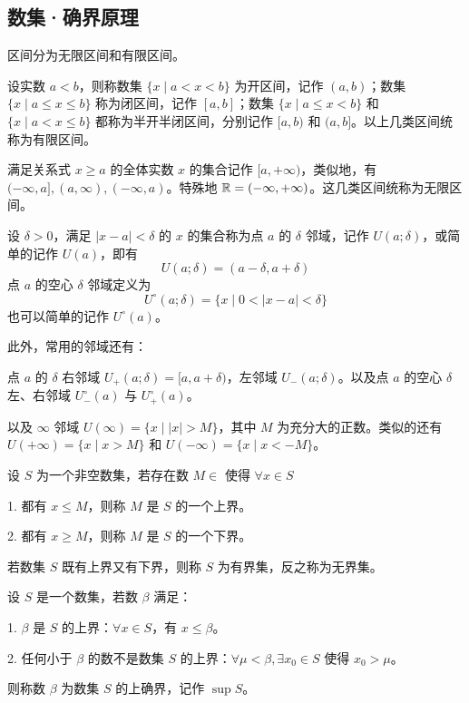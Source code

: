 \subsection{数集·确界原理}

区间分为无限区间和有限区间。

设实数 $a<b$，则称数集 $\{x \mid a<x<b\}$ 为开区间，记作 $(a,b)$；数集 $\{x \mid a\leqslant x \leqslant b\}$ 称为闭区间，记作 $[a,b]$；数集 $\{x \mid a\leqslant x<b\}$ 和 $\{x \mid a<x\leqslant b\}$ 都称为半开半闭区间，分别记作 $[a,b)$ 和 $(a,b]$。以上几类区间统称为有限区间。

满足关系式 $x\ge a$ 的全体实数 $x$ 的集合记作 $[a,+\infty)$，类似地，有 $(-\infty,a],(a,\infty),(-\infty,a)$。特殊地 $\mathbb{R} = (-\infty,+\infty)$。这几类区间统称为无限区间。

设 $\delta > 0$，满足 $|x-a|<\delta$ 的 $x$ 的集合称为点 $a$ 的 $\delta$ 邻域，记作 $U(a;\delta)$，或简单的记作 $U(a)$，即有
$$U(a;\delta) = (a-\delta,a+\delta)$$
点 $a$ 的空心 $\delta$ 邻域定义为
$$U^\circ (a;\delta) = \{x \mid 0<|x-a|<\delta\}$$
也可以简单的记作 $U^\circ(a)$。

此外，常用的邻域还有：

点 $a$ 的 $\delta$ 右邻域 $U_+(a;\delta) = [a,a+\delta)$，左邻域 $U_-(a;\delta)$。以及点 $a$ 的空心 $\delta$ 左、右邻域 $U_{-}^\circ(a)$ 与 $U_{+}^{\circ}(a)$。

以及 $\infty$ 邻域 $U(\infty) = \{x \mid |x|>M\}$，其中 $M$ 为充分大的正数。类似的还有 $U(+\infty) = \{x \mid x>M\}$ 和 $U(-\infty) = \{x \mid x<-M\}$。

\begin{definition}[有界集]
	设 $S$ 为一个非空数集，若存在数 $M\in$ 使得 $\forall x\in S$
	
	1. 都有 $x\leqslant M$，则称 $M$ 是 $S$ 的一个上界。
	
	2. 都有 $x\geqslant M$，则称 $M$ 是 $S$ 的一个下界。
\end{definition}

若数集 $S$ 既有上界又有下界，则称 $S$ 为有界集，反之称为无界集。

\begin{definition}[上确界]
	设 $S$ 是一个数集，若数 $\beta$ 满足：
	
	1. $\beta$ 是 $S$ 的上界：$\forall x\in S$，有 $x\leqslant \beta$。
	
	2. 任何小于 $\beta$ 的数不是数集 $S$ 的上界：$\forall \mu<\beta, \exists x_0\in S$ 使得 $x_0>\mu$。
	
	则称数 $\beta$ 为数集 $S$ 的上确界，记作 $\sup S$。
\end{definition}

